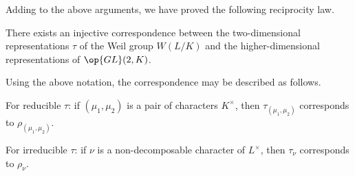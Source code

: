 \documentclass[../main.tex]{subfiles}
\begin{document}
Adding  to the above arguments, we have proved the following reciprocity law.
\begin{theorem}
	There exists an injective correspondence between the two-dimensional representations $\tau$ of the Weil group $W(L/K)$ and the higher-dimensional representations of $\op{GL}(2,K)$.

	Using the above notation, the correspondence may be described as follows.
	\begin{listalph}
		\item For reducible $\tau$: if $(\mu_1,\mu_2)$ is a pair of characters $K^\times$, then $\tau_{(\mu_1,\mu_2)}$ corresponds to $\rho_{(\mu_1,\mu_2)}$.
		\item For irreducible $\tau$: if $\nu$ is a non-decomposable character of $L^\times$, then $\tau_\nu$ corresponds to $\rho_\nu$.
	\end{listalph}
\end{theorem}
\end{document}
